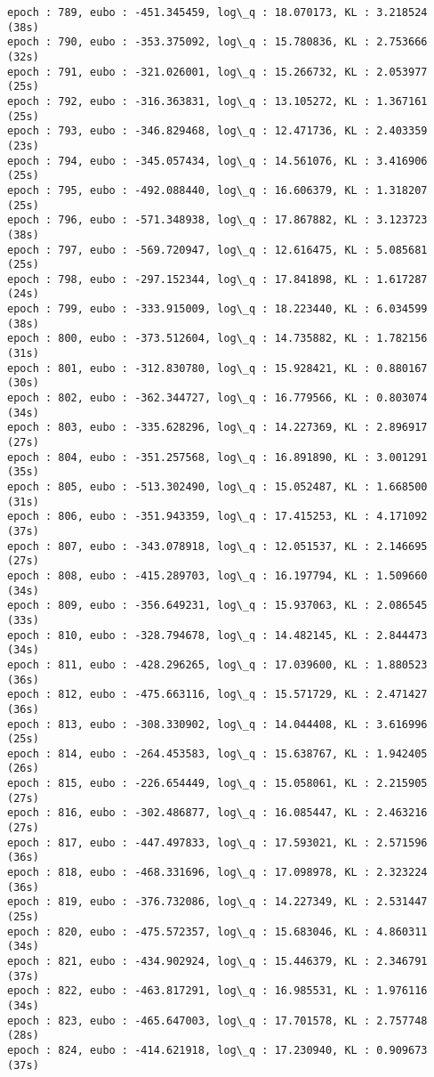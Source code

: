 \documentclass[11pt]{article}
\begin{document}
\begin{Verbatim}[commandchars=\\\{\}]
epoch : 789, eubo : -451.345459, log\_q : 18.070173, KL : 3.218524 (38s)
epoch : 790, eubo : -353.375092, log\_q : 15.780836, KL : 2.753666 (32s)
epoch : 791, eubo : -321.026001, log\_q : 15.266732, KL : 2.053977 (25s)
epoch : 792, eubo : -316.363831, log\_q : 13.105272, KL : 1.367161 (25s)
epoch : 793, eubo : -346.829468, log\_q : 12.471736, KL : 2.403359 (23s)
epoch : 794, eubo : -345.057434, log\_q : 14.561076, KL : 3.416906 (25s)
epoch : 795, eubo : -492.088440, log\_q : 16.606379, KL : 1.318207 (25s)
epoch : 796, eubo : -571.348938, log\_q : 17.867882, KL : 3.123723 (38s)
epoch : 797, eubo : -569.720947, log\_q : 12.616475, KL : 5.085681 (25s)
epoch : 798, eubo : -297.152344, log\_q : 17.841898, KL : 1.617287 (24s)
epoch : 799, eubo : -333.915009, log\_q : 18.223440, KL : 6.034599 (38s)
epoch : 800, eubo : -373.512604, log\_q : 14.735882, KL : 1.782156 (31s)
epoch : 801, eubo : -312.830780, log\_q : 15.928421, KL : 0.880167 (30s)
epoch : 802, eubo : -362.344727, log\_q : 16.779566, KL : 0.803074 (34s)
epoch : 803, eubo : -335.628296, log\_q : 14.227369, KL : 2.896917 (27s)
epoch : 804, eubo : -351.257568, log\_q : 16.891890, KL : 3.001291 (35s)
epoch : 805, eubo : -513.302490, log\_q : 15.052487, KL : 1.668500 (31s)
epoch : 806, eubo : -351.943359, log\_q : 17.415253, KL : 4.171092 (37s)
epoch : 807, eubo : -343.078918, log\_q : 12.051537, KL : 2.146695 (27s)
epoch : 808, eubo : -415.289703, log\_q : 16.197794, KL : 1.509660 (34s)
epoch : 809, eubo : -356.649231, log\_q : 15.937063, KL : 2.086545 (33s)
epoch : 810, eubo : -328.794678, log\_q : 14.482145, KL : 2.844473 (34s)
epoch : 811, eubo : -428.296265, log\_q : 17.039600, KL : 1.880523 (36s)
epoch : 812, eubo : -475.663116, log\_q : 15.571729, KL : 2.471427 (36s)
epoch : 813, eubo : -308.330902, log\_q : 14.044408, KL : 3.616996 (25s)
epoch : 814, eubo : -264.453583, log\_q : 15.638767, KL : 1.942405 (26s)
epoch : 815, eubo : -226.654449, log\_q : 15.058061, KL : 2.215905 (27s)
epoch : 816, eubo : -302.486877, log\_q : 16.085447, KL : 2.463216 (27s)
epoch : 817, eubo : -447.497833, log\_q : 17.593021, KL : 2.571596 (36s)
epoch : 818, eubo : -468.331696, log\_q : 17.098978, KL : 2.323224 (36s)
epoch : 819, eubo : -376.732086, log\_q : 14.227349, KL : 2.531447 (25s)
epoch : 820, eubo : -475.572357, log\_q : 15.683046, KL : 4.860311 (34s)
epoch : 821, eubo : -434.902924, log\_q : 15.446379, KL : 2.346791 (37s)
epoch : 822, eubo : -463.817291, log\_q : 16.985531, KL : 1.976116 (34s)
epoch : 823, eubo : -465.647003, log\_q : 17.701578, KL : 2.757748 (28s)
epoch : 824, eubo : -414.621918, log\_q : 17.230940, KL : 0.909673 (37s)

\end{Verbatim}
\end{document}
